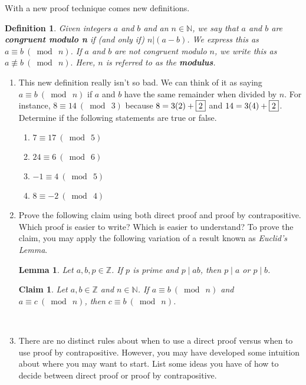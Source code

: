 \documentclass[12 pt]{article}
\newcommand{\Z}{\mathbb{Z}}
\newcommand{\N}{\mathbb{N}}
\newcommand{\divides}{\! \mid \!}
\newcommand{\mymod}[1]{ \ (\bmod \ #1)}
\theoremstyle{definition}
\theoremstyle{plain}
\theoremstyle{mytheorem}
\newtheorem*{lemma*}{Lemma}
\theoremstyle{myexample}
\newtheorem{claim}{Claim}
\theoremstyle{mydefinition}
\newtheorem*{definition*}{Definition}
\begin{document}
\noindent  With a new proof technique comes new definitions.
\begin{definition*}  Given integers $a$ and $b$ and an $n \in \N$, we say that $a$ and $b$ are \textbf{congruent modulo n} if (and only if) $n|(a-b)$.  We express this as $ a \equiv b \mymod{n}$.  If $a$ and $b$ are not congruent modulo $n$, we write this as $a \not\equiv b \mymod{n}.$  Here, $n$ is referred to as the \textbf{modulus}.
\end{definition*}

\begin{enumerate}[resume]
\item This new definition really isn't so bad.  We can think of it as saying $a \equiv b \mymod{n}$ if $a$ and $b$ have the same remainder when divided by $n$.  For instance, $8 \equiv 14 \mymod{3}$ because $8=3(2)+\fbox{2}$ and $14=3(4)+\fbox{2}$.  Determine if the following statements are true or false.
	\begin{enumerate} \itemsep=.5in
	\item $7 \equiv 17 \mymod{5}$
	\item $24 \equiv 6 \mymod{6}$
	\item $-1 \equiv 4 \mymod{5}$
	\item $8 \equiv -2 \mymod{4}$ 
	\vspace{.5in}
	\end{enumerate}

\item Prove the following claim using both direct proof and proof by contrapositive.  Which proof is easier to write?  Which is easier to understand?  To prove the claim, you may apply the following variation of a result known as \textit{Euclid's Lemma}.

\begin{lemma*}  Let $a,b,p \in \Z$.  If $p$ is prime and $p \divides ab$, then $p \divides a$ or $p \divides b$.
\end{lemma*}

\begin{claim} Let $a,b \in \Z$ and $n \in \N$.  If $a \equiv b \mymod{n}$ and $a \equiv c \mymod{n}$, then $c \equiv b \mymod{n}$.
\end{claim}

\newpage
\ 
\vspace{4in}

\item There are no distinct rules about when to use a direct proof versus when to use proof by contrapositive.  However, you may have developed some intuition about where you may want to start.  List some ideas you have of how to decide between direct proof or proof by contrapositive.

\end{enumerate}
\end{document}
